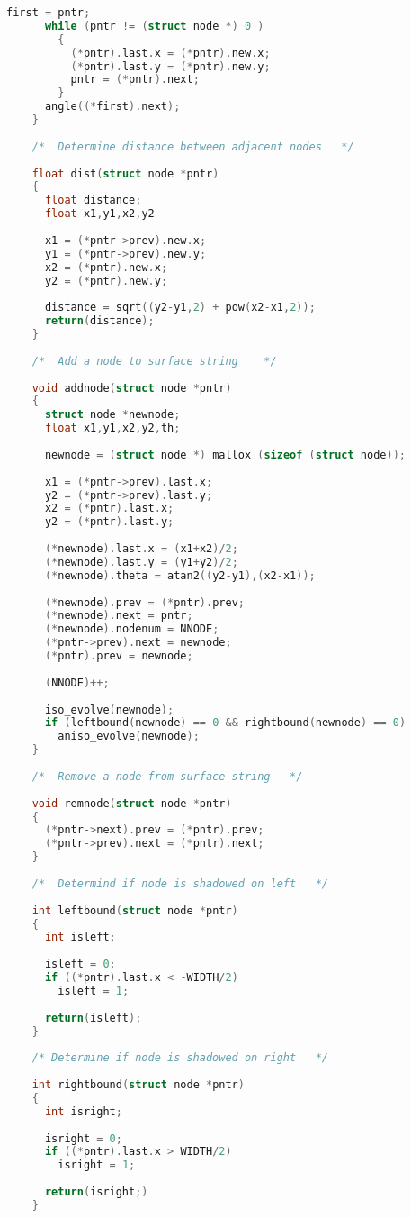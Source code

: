 \begin{lstlisting}[language=C]
  	  first = pntr;
  	  while (pntr != (struct node *) 0 )
  	  	{
  	  	  (*pntr).last.x = (*pntr).new.x;
  	  	  (*pntr).last.y = (*pntr).new.y;
  	  	  pntr = (*pntr).next;
    	}
      angle((*first).next);
  	}
  	
  	/*	Determine distance between adjacent nodes	*/
  	
  	float dist(struct node *pntr)
  	{
  	  float distance;
  	  float x1,y1,x2,y2
  	  
  	  x1 = (*pntr->prev).new.x;
  	  y1 = (*pntr->prev).new.y;
  	  x2 = (*pntr).new.x;
  	  y2 = (*pntr).new.y;
  	  
  	  distance = sqrt((y2-y1,2) + pow(x2-x1,2));
  	  return(distance);
  	}
  
  	/*	Add a node to surface string	*/
  	
  	void addnode(struct node *pntr)
  	{
  	  struct node *newnode;
  	  float x1,y1,x2,y2,th;
  	  
  	  newnode = (struct node *) mallox (sizeof (struct node));
  	  
  	  x1 = (*pntr->prev).last.x;
  	  y2 = (*pntr->prev).last.y;
  	  x2 = (*pntr).last.x;
  	  y2 = (*pntr).last.y;
  	  
  	  (*newnode).last.x = (x1+x2)/2;
  	  (*newnode).last.y = (y1+y2)/2;
  	  (*newnode).theta = atan2((y2-y1),(x2-x1));
  	  
  	  (*newnode).prev = (*pntr).prev;
  	  (*newnode).next = pntr;
  	  (*newnode).nodenum = NNODE;
  	  (*pntr->prev).next = newnode;
  	  (*pntr).prev = newnode;
  	  
  	  (NNODE)++;
  	  
  	  iso_evolve(newnode);
  	  if (leftbound(newnode) == 0 && rightbound(newnode) == 0)
  	  	aniso_evolve(newnode);
  	}
  
  	/*	Remove a node from surface string	*/
  	
  	void remnode(struct node *pntr)
  	{
  	  (*pntr->next).prev = (*pntr).prev;
  	  (*pntr->prev).next = (*pntr).next;
  	}
  
  	/*	Determind if node is shadowed on left	*/
  	
  	int leftbound(struct node *pntr)
  	{
  	  int isleft;
  	  
  	  isleft = 0;
  	  if ((*pntr).last.x < -WIDTH/2)
  	  	isleft = 1;
  	  	
  	  return(isleft);
  	}
  
  	/* Determine if node is shadowed on right	*/
  	
  	int rightbound(struct node *pntr)
  	{
  	  int isright;
  	  
  	  isright = 0;
  	  if ((*pntr).last.x > WIDTH/2)
  	  	isright = 1;
  	  	
  	  return(isright;)
  	}
\end{lstlisting}